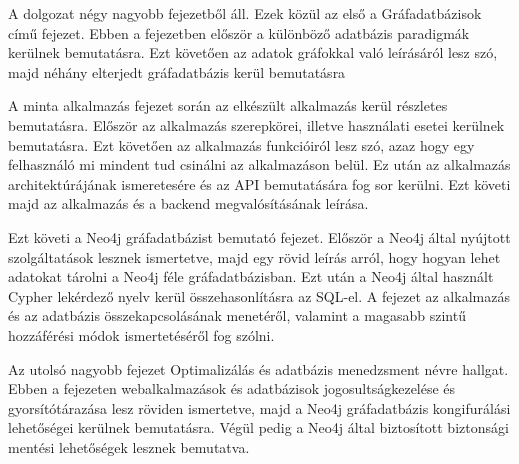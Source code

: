 




A dolgozat négy nagyobb fejezetből áll. Ezek közül az első a Gráfadatbázisok című fejezet.
Ebben a fejezetben először a különböző adatbázis paradigmák kerülnek bemutatásra. Ezt követően az adatok gráfokkal való leírásáról lesz szó, majd néhány elterjedt gráfadatbázis kerül bemutatásra

\bigskip

A minta alkalmazás fejezet során az elkészült alkalmazás kerül részletes bemutatásra. Először az alkalmazás szerepkörei, illetve használati esetei kerülnek bemutatásra. Ezt követően az alkalmazás funkcióiról lesz szó, azaz hogy egy felhasználó mi mindent tud csinálni az alkalmazáson belül. Ez után az alkalmazás architektúrájának ismeretesére és az API bemutatására fog sor kerülni. Ezt követi majd az alkalmazás és a backend megvalósításának leírása.

\bigskip

Ezt követi a Neo4j gráfadatbázist bemutató fejezet. Először a Neo4j által nyújtott szolgáltatások lesznek ismertetve, majd egy rövid leírás arról, hogy hogyan lehet adatokat tárolni a Neo4j féle gráfadatbázisban. Ezt után a Neo4j által használt Cypher lekérdező nyelv kerül összehasonlításra az SQL-el. A fejezet az alkalmazás és az adatbázis összekapcsolásának menetéről, valamint a magasabb szintű hozzáférési módok ismertetéséről fog szólni.

\bigskip

Az utolsó nagyobb fejezet Optimalizálás és adatbázis menedzsment névre hallgat. Ebben a fejezeten webalkalmazások és adatbázisok jogosultságkezelése és gyorsítótárazása lesz röviden ismertetve, majd a Neo4j gráfadatbázis kongifurálási lehetőségei kerülnek bemutatásra. Végül pedig a Neo4j által biztosított biztonsági mentési lehetőségek lesznek bemutatva.